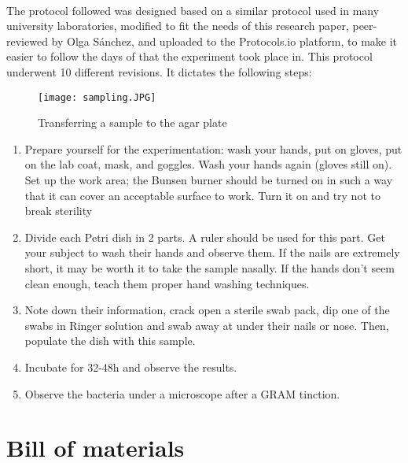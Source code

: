 \paragraph{}The protocol followed was designed based on a similar protocol used in many university laboratories\cite{olearyPracticalHandbookMicrobiology1989}, modified to fit the needs of this research paper, peer-reviewed by Olga Sánchez, and uploaded to the Protocols.io platform, to make it easier to follow the days of that the experiment took place in. This protocol underwent 10 different revisions\cite{rocacugatStaphilococcusAureusSampling2022a}. It dictates the following steps: \newline\begin{wrapfigure}{r}{0.4\textwidth}\begin{center}\texttt{[image: sampling.JPG]}\end{center}\caption{Transferring a sample to the agar plate}\end{wrapfigure}
\begin{enumerate}[label=\arabic*)]
\item Prepare yourself for the experimentation: wash your hands, put on gloves, put on the lab coat, mask, and goggles. Wash your hands again (gloves still on). Set up the work area; the Bunsen burner should be turned on in such a way that it can cover an acceptable surface to work. Turn it on and try not to break sterility
\item Divide each Petri dish in 2 parts. A ruler should be used for this part. Get your subject to wash their hands and observe them. If the nails are extremely short, it may be worth it to take the sample nasally. If the hands don't seem clean enough, teach them proper hand washing techniques.
\item Note down their information, crack open a sterile swab pack, dip one of the swabs in Ringer solution and swab away at under their nails or nose. Then, populate the dish with this sample.
\item Incubate for 32-48h and observe the results.
\item Observe the bacteria under a microscope after a GRAM tinction.
\end{enumerate}\newpage
\section{Bill of materials}
